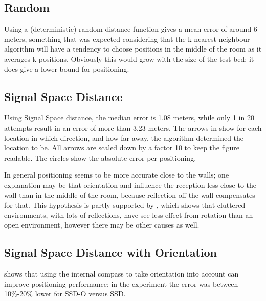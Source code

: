 
\subsection{Random}
Using a (deterministic) random distance function gives a mean error of around 6 meters, something that was expected considering that the k-nearest-neighbour algorithm will have a tendency to choose positions in the middle of the room as it averages k positions.
Obviously this would grow with the size of the test bed; it does give a lower bound for positioning.
\subsection{Signal Space Distance}
Using Signal Space distance, the median error is 1.08 meters, while only 1 in 20 attempts result in an error of more than 3.23 meters.
The arrows in  show for each location in which direction, and how far away, the algorithm determined the location to be.
All arrows are scaled down by a factor 10 to keep the figure readable.
The circles show the absolute error per positioning.

In general positioning seems to be more accurate close to the walls; one explanation may be that orientation and \mpi influence the reception less close to the wall than in the middle of the room, because reflection off the wall compensates for that.
This hypothesis is partly supported by , which shows that cluttered environments, with lots of reflections, have see less effect from rotation than an open environment, however there may be other causes as well.


\subsection{Signal Space Distance with Orientation}
\label{sec:architecture-measurements-ssd-o}
 shows that using the internal compass to take orientation into account can improve positioning performance; in the experiment the error was between 10\%-20\% lower for SSD-O versus SSD.

